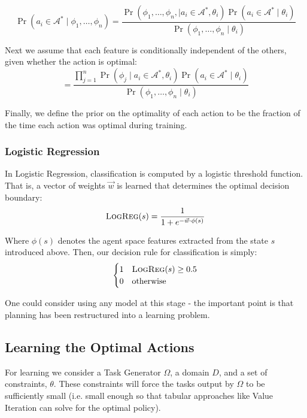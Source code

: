 \documentclass[11pt]{article}
\begin{document}
\begin{equation}
\Pr(a_i \in \mathcal{A}^*  \mid \phi_1, \ldots, \phi_n) = \frac{\Pr(\phi_1, \ldots, \phi_{n}, \mid a_i \in \mathcal{A}^*, \theta_i) \Pr(a_i \in \mathcal{A}^* \mid \theta_i)}{\Pr(\phi_1, \ldots, \phi_{n} \mid \theta_i)}
\label{eq:bayes}
\end{equation}

Next we assume that each feature is conditionally independent of the others, given whether the action is optimal:
\begin{equation}
= \frac{\prod_{j=1}^{n} \Pr(\phi_j \mid a_i \in \mathcal{A}^*, \theta_i) \Pr(a_i \in \mathcal{A}^* \mid \theta_i) }{\Pr(\phi_1, \ldots, \phi_{n} \mid \theta_i)}
\label{eq:final}
\end{equation}

Finally, we define the prior on the optimality of each action to be
the fraction of the time each action was optimal during training.

\subsubsection{Logistic Regression}

In Logistic Regression, classification is computed by a logistic threshold function. That is, a vector of weights $\vec{w}$ is learned that determines the optimal decision boundary:
\begin{equation}
\textsc{LogReg}(s) = \frac{1}{1 + e^{-\vec{w} \cdot \phi(s)}}
\end{equation}

Where $\phi(s)$ denotes the agent space features extracted from the state $s$ introduced above. Then, our decision rule for classification is simply:
\begin{equation}
\begin{cases}
1&\textsc{LogReg}(s) \geq 0.5 \\
0&\text{otherwise}
\end{cases}
\end{equation}

One could consider using any model at this stage - the important point is that planning has been restructured into a learning problem.

\subsection{Learning the Optimal Actions}
For learning we consider a Task Generator $\Omega$, a domain $D$, and a set of constraints, $\theta$. These constraints will force the tasks output by $\Omega$ to be sufficiently small (i.e. small enough so that tabular approaches like Value Iteration can solve for the optimal policy).
\end{document}
